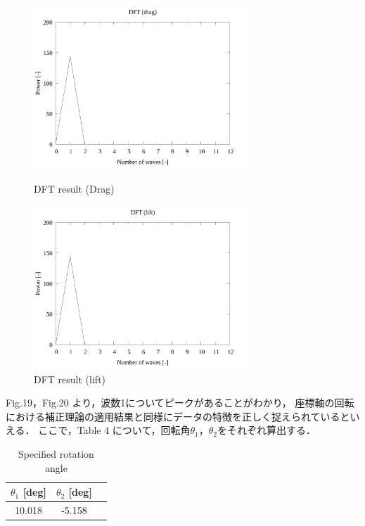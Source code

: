 \documentclass[twocolumn,a4j]{jsarticle}
\begin{document}
\newpage
\begin{figure}[htbp]
        \begin{center}
        \includegraphics[width=82mm]{../../../02_workspace/result/simulation_tx=10.0_ty=-5.0_dx=5.00_dy=-2.50/plot/07/07-3_dft-drag.png}
        \caption{DFT result (Drag)}
        \includegraphics[width=82mm]{../../../02_workspace/result/simulation_tx=10.0_ty=-5.0_dx=5.00_dy=-2.50/plot/07/07-4_dft-lift.png}
        \caption{DFT result (lift)}
        \end{center}
    \end{figure}

Fig.19，Fig.20 より，波数1についてピークがあることがわかり，
座標軸の回転における補正理論の適用結果と同様にデータの特徴を正しく捉えられているといえる．
ここで，Table 4 について，回転角$\theta_1$，$\theta_2$をそれぞれ算出する．

\begin{table}[htbp]
    \begin{center}
        \caption{Specified rotation angle}
        \begin{tabular}{|p{30mm}|p{20mm}|p{20mm}|}
            \hline
            \multicolumn{1}{|c|}{$\theta_1$ [deg]}   & \multicolumn{1}{|c|}{$\theta_2$ [deg]} \\ \hline
            \multicolumn{1}{|c|}{10.018}     & \multicolumn{1}{|c|}{-5.158}         \\ \hline
        \end{tabular}
    \end{center}
\end{table}
\end{document}
